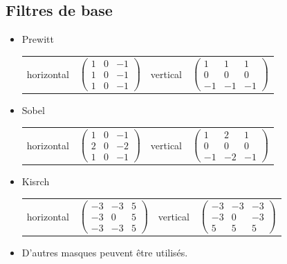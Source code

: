 \documentclass[11pt]{article}
\begin{document}
	\subsection{Filtres de base} 

	\begin{itemize}
		\item Prewitt

			\begin{tabular}{cccc}
				horizontal &
				$
				\begin{pmatrix}
					1 & 0 & -1 \\
					1 & 0 & -1 \\
					1 & 0 & -1
				\end{pmatrix}
				$
				&
				vertical &
				$
				\begin{pmatrix}
				1 & 1 & 1 \\
				0 & 0 & 0 \\
				-1 & -1 & -1
				\end{pmatrix}
				$
			\end{tabular}

		\item Sobel

			\begin{tabular}{cccc}
				horizontal &
				$
				\begin{pmatrix}
				1 & 0 & -1 \\
				2 & 0 & -2 \\
				1 & 0 & -1
				\end{pmatrix}
				$
				&
				vertical &
				$
				\begin{pmatrix}
				1 & 2 & 1 \\
				0 & 0 & 0 \\
				-1 & -2 & -1
				\end{pmatrix}
				$
			\end{tabular}

		\item Kisrch

			\begin{tabular}{cccc}
				horizontal &
				$
				\begin{pmatrix}
				-3 & -3 & 5 \\
				-3 & 0 & 5 \\
				-3 & -3 & 5
				\end{pmatrix}
				$
				&
				vertical &
				$
				\begin{pmatrix}
				-3 & -3 & -3 \\
				-3 & 0 & -3 \\
				5 & 5 & 5
				\end{pmatrix}
				$
			\end{tabular}
			
			\item D'autres masques peuvent être utilisés.
	\end{itemize}
\end{document}
